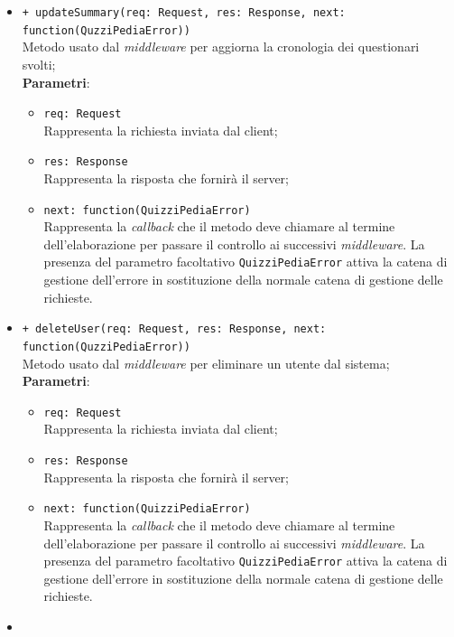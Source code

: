 \begin{itemize}
\begin{itemize}
		  \item
		\texttt{+ updateSummary(req: Request, res: Response, next: \\function(QuzziPediaError))} \\
		Metodo usato dal \textit{middleware} per aggiorna la cronologia dei questionari svolti; \\
		\textbf{Parametri}:
		 \begin{itemize}
		  \item
			\texttt{req: Request} \\
			Rappresenta la richiesta inviata dal client;
		  \item
			\texttt{res: Response} \\
			Rappresenta la risposta che fornirà il server;
		  \item
		    \texttt{next: function(QuizziPediaError)} \\
			Rappresenta la \textit{callback} che il metodo deve chiamare al termine dell'elaborazione per passare il controllo ai successivi \textit{middleware}. La presenza del parametro facoltativo \texttt{QuizziPediaError} attiva la catena di gestione dell'errore in sostituzione della normale catena di gestione delle richieste.
		 \end{itemize}
		 \item
		 \texttt{+ deleteUser(req: Request, res: Response, next: function(QuzziPediaError))} \\
		Metodo usato dal \textit{middleware} per eliminare un utente dal sistema; \\
		\textbf{Parametri}:
		 \begin{itemize}
		  \item
			\texttt{req: Request} \\
			Rappresenta la richiesta inviata dal client;
		  \item
			\texttt{res: Response} \\
			Rappresenta la risposta che fornirà il server;
		  \item
		    \texttt{next: function(QuizziPediaError)} \\
			Rappresenta la \textit{callback} che il metodo deve chiamare al termine dell'elaborazione per passare il controllo ai successivi \textit{middleware}. La presenza del parametro facoltativo \texttt{QuizziPediaError} attiva la catena di gestione dell'errore in sostituzione della normale catena di gestione delle richieste.
		 \end{itemize}
		  \item

\end{itemize}
\end{itemize}
